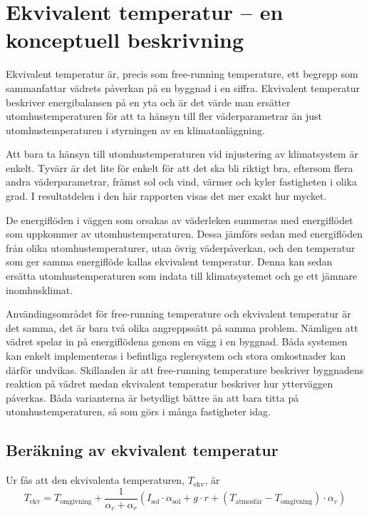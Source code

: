 \section{Ekvivalent temperatur  – en konceptuell beskrivning}
\label{sec:ekv_temp}

Ekvivalent temperatur är, precis som free-running temperature, ett begrepp som sammanfattar vädrets påverkan på en byggnad i en siffra. Ekvivalent temperatur beskriver energibalansen på en yta och är det värde man ersätter utomhustemperaturen för att ta 
hänsyn till fler väderparametrar än just utomhustemperaturen i styrningen av en 
klimatanläggning.

Att bara ta hänsyn till utomhustemperaturen vid injustering av klimatsystem är enkelt. 
Tyvärr är det lite för enkelt för att det ska bli riktigt bra, eftersom flera andra 
väderparametrar, främst sol och vind, värmer och kyler fastigheten i olika grad. I resultatdelen i den här rapporten visas det mer exakt hur mycket.

De energiflöden i väggen som orsakas av väderleken summeras med energiflödet 
som uppkommer av utomhustemperaturen. Dessa jämförs sedan med energiflöden från 
olika utomhustemperaturer, utan övrig väderpåverkan, och den temperatur som ger 
samma energiflöde kallas ekvivalent temperatur. Denna kan sedan ersätta 
utomhustemperaturen som indata till klimatsystemet och ge ett jämnare inomhusklimat. 

Användingsområdet för free-running temperature och ekvivalent temperatur är det samma, det är bara två olika angreppssätt på samma problem. Nämligen att vädret spelar in på energiflödena genom en vägg i en byggnad.  Båda systemen kan enkelt implementeras i befintliga reglersystem och stora omkostnader kan därför undvikas. Skillanden är att  free-running temperature beskriver byggnadens reaktion på vädret medan ekvivalent temperatur beskriver hur ytterväggen påverkas. Båda varianterna är betydligt bättre än att bara titta på utomhustemperaturen, så som görs i många fastigheter idag.

\subsection{Beräkning av ekvivalent temperatur}
Ur \cite[ss.~53-54]{Hagentoft01} fås att den ekvivalenta temperaturen, $T_\text{ekv}$, är
\begin{equation}
T_\text{ekv}=T_\text{omgivning}+\frac{1}{\alpha_c+\alpha_r}(I_\text{sol} \cdot \alpha_\text{sol} + g \cdot r + (T_\text{atmosfär} - T_\text{omgivning})\cdot \alpha_r)
\end{equation}

